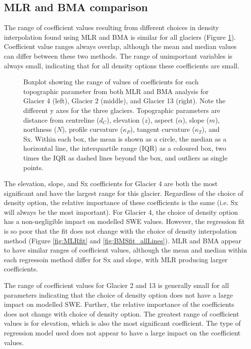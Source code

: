 \documentclass[12pt]{article}
\newcommand{\params}{Topographic parameters are distance from centreline ($d_C$), elevation ($z$), aspect ($\alpha$), slope ($m$), northness ($N$), profile curvature ($\kappa_P$), tangent curvature ($\kappa_T$), and Sx. }
\newcommand{\boxplot}{Within each box, the mean is shown as a circle, the median as a horizontal line, the interquartile range (IQR) as a coloured box, two times the IQR as dashed lines beyond the box, and outliers as single points. }
\begin{document}
\subsection{MLR and BMA comparison}

The range of coefficient values resulting from different choices in density interpolation found using MLR and BMA is similar for all glaciers (Figure \ref{fig:allCeoffs_boxplot}). Coefficient value ranges always overlap, although the mean and median values can differ between these two methods. The range of unimportant variables is always small, indicating that for all density options these coefficients are small. 

\begin{figure}[H]
	\caption{Boxplot showing the range of values of coefficients for each topographic parameter from both MLR and BMA analysis for Glacier 4 (left), Glacier 2 (middle), and Glacier 13 (right). Note the different y axes for the three glaciers. \params \boxplot}
	\label{fig:allCeoffs_boxplot}
\end{figure}

The elevation, slope, and Sx coefficients for Glacier 4 are both the most significant and have the largest range for this glacier. Regardless of the choice of density option, the relative importance of these coefficients is the same (i.e. Sx will always be the most important). For Glacier 4, the choice of density option has a non-negligible impact on modelled SWE values. However, the regression fit is so poor that the fit does not change with the choice of density interpolation method (Figure \ref{fig:MLRfit} and \ref{fig:BMSfit_allLines}). MLR and BMA appear to have similar ranges of coefficient values, although the mean and median within each regressoin method differ for Sx and slope, with MLR producing larger coefficients.

The range of coefficient values for Glacier 2 and 13 is generally small for all parameters indicating that the choice of density option does not have a large impact on modelled SWE. Further, the relative importance of the coefficients does not change with choice of density option. The greatest range of coefficient values is for elevation, which is also the most significant coefficient. The type of regression model used does not appear to have a large impact on the coefficient values.
\end{document}
